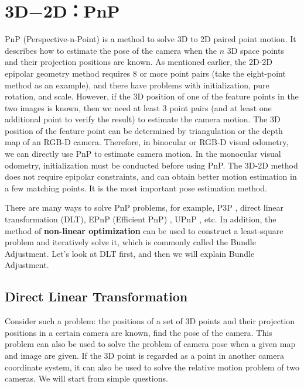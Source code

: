 \section{3D−2D：PnP}
PnP (Perspective-n-Point) is a method to solve 3D to 2D paired point motion. It describes how to estimate the pose of the camera when the $n$ 3D space points and their projection positions are known. As mentioned earlier, the 2D-2D epipolar geometry method requires 8 or more point pairs (take the eight-point method as an example), and there have problems with initialization, pure rotation, and scale. However, if the 3D position of one of the feature points in the two images is known, then we need at least 3 point pairs (and at least one additional point to verify the result) to estimate the camera motion. The 3D position of the feature point can be determined by triangulation or the depth map of an RGB-D camera. Therefore, in binocular or RGB-D visual odometry, we can directly use PnP to estimate camera motion. In the monocular visual odometry, initialization must be conducted before using PnP. The 3D-2D method does not require epipolar constraints, and can obtain better motion estimation in a few matching points. It is the most important pose estimation method.

There are many ways to solve PnP problems, for example, P3P {\cite{GaoHouTangEtAl2003}}, direct linear transformation (DLT), EPnP (Efficient PnP) {\cite{LepetitMoreno-NoguerFua2008 }}, UPnP {\cite{Penate-SanchezAndrade-CettoMoreno-Noguer2013}}, etc. In addition, the method of \textbf{non-linear optimization} can be used to construct a least-square problem and iteratively solve it, which is commonly called the Bundle Adjustment. Let's look at DLT first, and then we will explain Bundle Adjustment.

\subsection{Direct Linear Transformation}
Consider such a problem: the positions of a set of 3D points and their projection positions in a certain camera are known, find the pose of the camera. This problem can also be used to solve the problem of camera pose when a given map and image are given. If the 3D point is regarded as a point in another camera coordinate system, it can also be used to solve the relative motion problem of two cameras. We will start from simple questions.

